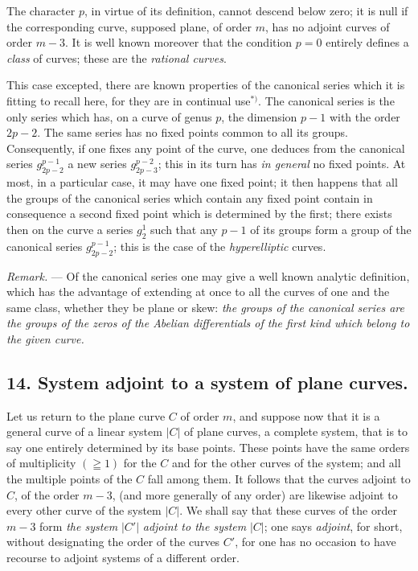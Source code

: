 \documentclass{article}
\begin{document}

The character $p$, in virtue of its definition, cannot descend below zero; it is null if the corresponding curve, supposed plane, of order $m$, has no adjoint curves of order $m - 3$. It is well known moreover that the condition $p = 0$ entirely defines a \emph{class} of curves; these are the \emph{rational curves}.

This case excepted, there are known properties of the canonical series which it is fitting to recall here, for they are in continual use${}^{*)}$. The canonical series is the only series which has, on a curve of genus $p$, the dimension $p - 1$ with the order $2p - 2$. The same series has no fixed points common to all its groups. Consequently, if one fixes any point of the curve, one deduces from the canonical series $g_{2p-2}^{p-1}$ a new series $g_{2p-3}^{p-2}$; this in its turn has \emph{in general} no fixed points. At most, in a particular case, it may have one fixed point; it then happens that all the groups of the canonical series which contain any fixed point contain in consequence a second fixed point which is determined by the first; there exists then on the curve a series $g_{2}^{1}$ such that any $p - 1$ of its groups form a group of the canonical series $g_{2p-2}^{p-1}$; this is the case of the \emph{hyperelliptic} curves.

\emph{Remark.} --- Of the canonical series one may give a well known analytic definition, which has the advantage of extending at once to all the curves of one and the same class, whether they be plane or skew: \emph{the groups of the canonical series are the groups of the zeros of the Abelian differentials of the first kind which belong to the given curve.}

\subsection*{14. System adjoint to a system of plane curves.}

Let us return to the plane curve $C$ of order $m$, and suppose now that it is a general curve of a linear system $|C|$ of plane curves, a complete system, that is to say one entirely determined by its base points. These points have the same orders of multiplicity $(\geqq 1)$ for the $C$ and for the other curves of the system; and all the multiple points of the $C$ fall among them. It follows that the curves adjoint to $C$, of the order $m - 3$, (and more generally of any order) are likewise adjoint to every other curve of the system $|C|$. We shall say that these curves of the order $m - 3$ form \emph{the system} $|C'|$ \emph{adjoint to the system} $|C|$; one says \emph{adjoint}, for short, without designating the order of the curves $C'$, for one has no occasion to have recourse to adjoint systems of a different order.
\end{document}

